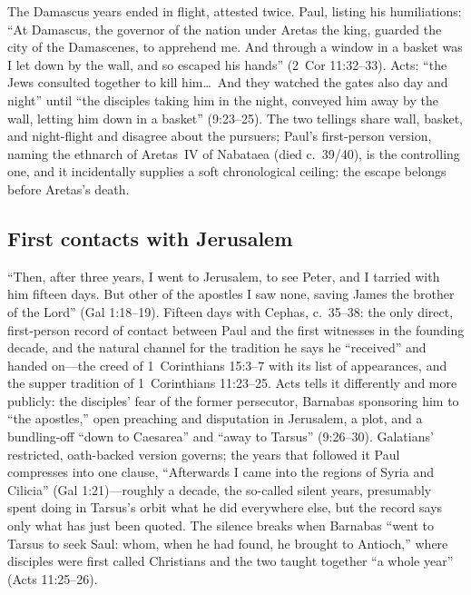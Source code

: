 The Damascus years ended in flight, attested twice. Paul, listing his
humiliations: ``At Damascus, the governor of the nation under Aretas the
king, guarded the city of the Damascenes, to apprehend me. And through a
window in a basket was I let down by the wall, and so escaped his hands''
(2~Cor 11:32--33). Acts: ``the Jews consulted together to kill him\ldots\
And they watched the gates also day and night'' until ``the disciples
taking him in the night, conveyed him away by the wall, letting him down
in a basket'' (9:23--25). The two tellings share wall, basket, and
night-flight and disagree about the pursuers; Paul's first-person version,
naming the ethnarch of Aretas~IV of Nabataea (died c.~39/40), is the
controlling one, and it incidentally supplies a soft chronological
ceiling: the escape belongs before Aretas's death.

\subsection{First contacts with Jerusalem}

``Then, after three years, I went to Jerusalem, to see Peter, and I
tarried with him fifteen days. But other of the apostles I saw none,
saving James the brother of the Lord'' (Gal 1:18--19). Fifteen days with
Cephas, c.~35--38: the only direct, first-person record of contact between
Paul and the first witnesses in the founding decade, and the natural
channel for the tradition he says he ``received'' and handed on---the
creed of 1~Corinthians 15:3--7 with its list of appearances, and the
supper tradition of 1~Corinthians 11:23--25. Acts tells it differently
and more publicly: the disciples' fear of the former persecutor, Barnabas
sponsoring him to ``the apostles,'' open preaching and disputation in
Jerusalem, a plot, and a bundling-off ``down to Caesarea'' and ``away to
Tarsus'' (9:26--30). Galatians' restricted, oath-backed version governs;
the years that followed it Paul compresses into one clause, ``Afterwards
I came into the regions of Syria and Cilicia'' (Gal 1:21)---roughly a
decade, the so-called silent years, presumably spent doing in Tarsus's
orbit what he did everywhere else, but the record says only what has just
been quoted. The silence breaks when Barnabas ``went to Tarsus to seek
Saul: whom, when he had found, he brought to Antioch,'' where disciples
were first called Christians and the two taught together ``a whole year''
(Acts 11:25--26).

